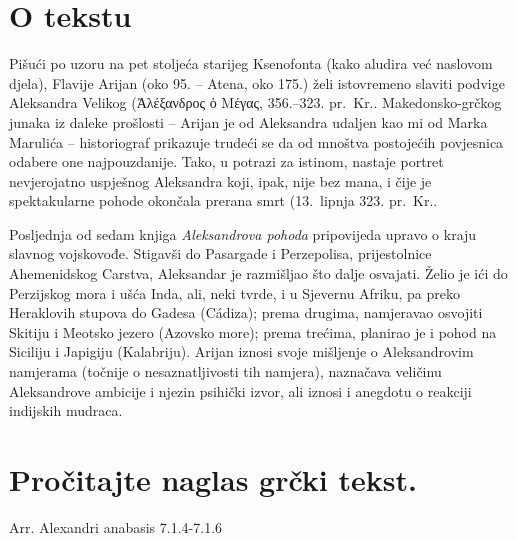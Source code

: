 


\section*{O tekstu}

Pišući po uzoru na pet stoljeća starijeg Ksenofonta (kako aludira već naslovom djela), Flavije Arijan (oko 95. – Atena, oko 175.) želi istovremeno slaviti podvige Aleksandra Velikog (Ἀλέξανδρος ὁ Μέγας, 356.–323. pr.~Kr.. Makedonsko-grčkog junaka iz daleke prošlosti – Arijan je od Aleksandra udaljen kao mi od Marka Marulića – historiograf prikazuje trudeći se da od mnoštva postojećih povjesnica odabere one najpouzdanije. Tako, u potrazi za istinom, nastaje portret nevjerojatno uspješnog Aleksandra koji, ipak, nije bez mana, i čije je spektakularne pohode okončala prerana smrt (13.\ lipnja 323. pr.~Kr..

Posljednja od sedam knjiga \textit{Aleksandrova pohoda} pripovijeda upravo o kraju slavnog vojskovođe. Stigavši do Pasargade i Perzepolisa, prijestolnice Ahemenidskog Carstva, Aleksandar je razmišljao što dalje osvajati. Želio je ići do Perzijskog mora i ušća Inda, ali, neki tvrde, i u Sjevernu Afriku, pa preko Heraklovih stupova do Gadesa (Cádiza); prema drugima, namjeravao osvojiti Skitiju i Meotsko jezero (Azovsko more); prema trećima, planirao je i pohod na Siciliju i Japigiju (Kalabriju). Arijan iznosi svoje mišljenje o Aleksandrovim namjerama (točnije o nesaznatljivosti tih namjera), naznačava veličinu Aleksandrove ambicije i njezin psihički izvor, ali iznosi i anegdotu o reakciji indijskih mudraca.

\newpage

\section*{Pročitajte naglas grčki tekst.}

Arr. Alexandri anabasis 7.1.4-7.1.6


\medskip


